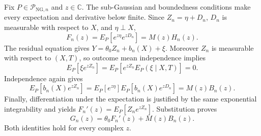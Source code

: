 Fix \(P\in\mathcal P_{\mathrm{NG},n}\) and \(z\in\mathbb C\).  The sub-Gaussian and boundedness conditions make every expectation and derivative below finite.  Since \(Z_n=\eta+D_n\), \(D_n\) is measurable with respect to \(X\), and \(\eta\perp X\),
\[
 F_n(z)=E_P[e^{z\eta}e^{zD_n}]=M(z)H_n(z).
\]
The residual equation gives \(Y=\theta_0Z_n+b_n(X)+\xi\).  Moreover \(Z_n\) is measurable with respect to \((X,T)\), so outcome mean independence implies
\[
 E_P[\xi e^{zZ_n}]
 =E_P[e^{zZ_n}E_P(\xi\mid X,T)]=0.
\]
Independence again gives
\[
 E_P[b_n(X)e^{zZ_n}]
 =E_P[e^{z\eta}]E_P[b_n(X)e^{zD_n}]=M(z)B_n(z).
\]
Finally, differentiation under the expectation is justified by the same exponential integrability and yields \(F_n'(z)=E_P[Z_ne^{zZ_n}]\).  Substitution proves
\[
 G_n(z)=\theta_0F_n'(z)+M(z)B_n(z).
\]
Both identities hold for every complex \(z\).